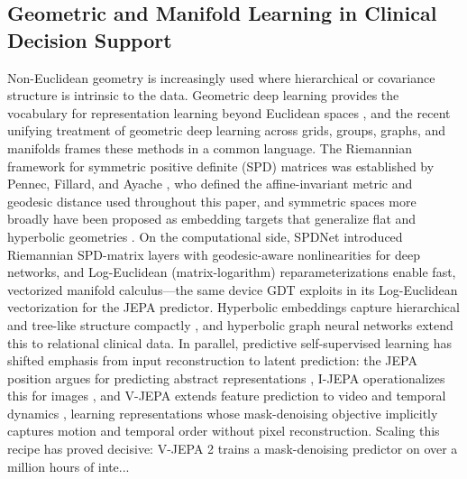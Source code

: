 \documentclass[11pt]{article}
\begin{document}
\subsection{Geometric and Manifold Learning in Clinical Decision Support}
Non-Euclidean geometry is increasingly used where hierarchical or covariance structure is intrinsic to the data. Geometric deep learning provides the vocabulary for representation learning beyond Euclidean spaces \citep{bronstein2017}, and the recent unifying treatment of geometric deep learning across grids, groups, graphs, and manifolds \citep{bronstein2021_gdl} frames these methods in a common language. The Riemannian framework for symmetric positive definite (SPD) matrices was established by Pennec, Fillard, and Ayache \citep{pennec2006_spd}, who defined the affine-invariant metric and geodesic distance used throughout this paper, and symmetric spaces more broadly have been proposed as embedding targets that generalize flat and hyperbolic geometries \citep{lopez2021}. On the computational side, SPDNet \citep{huang2017_spdnet} introduced Riemannian SPD-matrix layers with geodesic-aware nonlinearities for deep networks, and Log-Euclidean (matrix-logarithm) reparameterizations \citep{arsigny2007_logeuclidean} enable fast, vectorized manifold calculus---the same device GDT exploits in its Log-Euclidean vectorization for the JEPA predictor. Hyperbolic embeddings capture hierarchical and tree-like structure compactly \citep{nickel2017_poincare}, and hyperbolic graph neural networks \citep{chami2019_hgcn} extend this to relational clinical data. In parallel, predictive self-supervised learning has shifted emphasis from input reconstruction to latent prediction: the JEPA position argues for predicting abstract representations \citep{lecun2022}, I-JEPA operationalizes this for images \citep{assran2023_ijepa}, and V-JEPA extends feature prediction to video and temporal dynamics \citep{bardes2024_vjepa}, learning representations whose mask-denoising objective implicitly captures motion and temporal order without pixel reconstruction. Scaling this recipe has proved decisive: V-JEPA 2 \citep{assran2025_vjepa2} trains a mask-denoising predictor on over a million hours of inte...
\end{document}
